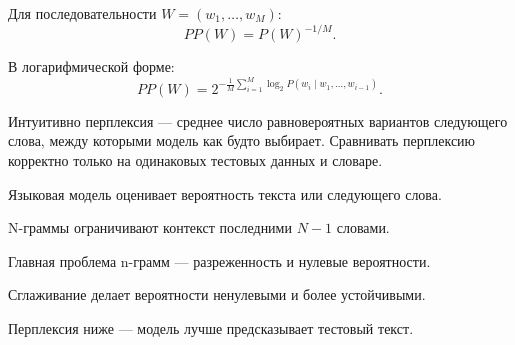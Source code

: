 Для последовательности $W=(w_1,\ldots,w_M)$:
\[
PP(W)=P(W)^{-1/M}.
\]

В логарифмической форме:
\[
PP(W)=2^{-\frac{1}{M}\sum_{i=1}^{M}\log_2 P(w_i\mid w_1,\ldots,w_{i-1})}.
\]

Интуитивно перплексия --- среднее число равновероятных вариантов следующего слова, между которыми модель как будто выбирает. Сравнивать перплексию корректно только на одинаковых тестовых данных и словаре.

\begin{important}
    \item Языковая модель оценивает вероятность текста или следующего слова.
    \item N-граммы ограничивают контекст последними $N-1$ словами.
    \item Главная проблема n-грамм --- разреженность и нулевые вероятности.
    \item Сглаживание делает вероятности ненулевыми и более устойчивыми.
    \item Перплексия ниже --- модель лучше предсказывает тестовый текст.
\end{important}
